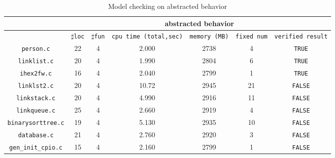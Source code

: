 \begin{table}
  \scriptsize
\begin{tabular}{|c|c|c|c|c|c|c|}
\hline
&\multicolumn{6}{|c|}{abstracted behavior} \\
\hline
 &$\sharp$\texttt{loc} & $\sharp$\texttt{fun} & \texttt{cpu time (total,sec)} & \texttt{memory (MB)} & \texttt{fixed num} & \texttt{verified result} \\
\hline
\texttt{person.c} & 22 & 4 & 2.000 & 2738 & 4 & \texttt{TRUE}  \\
\hline
\texttt{linklist.c} &  20 & 4 & 1.990 & 2804 & 6 & \texttt{TRUE} \\
\hline
\texttt{ihex2fw.c}  & 16 & 4 & 2.040 & 2799 & 1 & \texttt{TRUE} \\
\hline
\texttt{linklst2.c} & 20 & 4 & 10.72 & 2945 & 21 & \texttt{FALSE} \\
\hline
\texttt{linkstack.c} & 20 & 4 & 4.990 & 2916 & 11 & \texttt{FALSE} \\
\hline
\texttt{linkqueue.c} & 25 & 4 & 2.660 & 2919 & 4 & \texttt{FALSE} \\
\hline
\texttt{binarysorttree.c} & 19 & 4 & 5.130 & 2935 & 10 & \texttt{FALSE} \\
\hline
\texttt{database.c}  & 21 & 4 & 2.760 & 2920 & 3 & \texttt{FALSE} \\
\hline
\texttt{gen\_init\_cpio.c} & 15 & 4 & 2.160 & 2799 & 1 & \texttt{FALSE} \\
\hline
\end{tabular}
\caption{Model checking on abstracted behavior}
\label{tb:mca}
\end{table}


